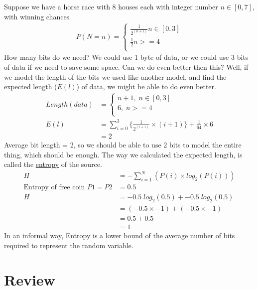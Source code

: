 \documentclass{article}
\begin{document}
    Suppose we have a horse race with 8 houses each with integer number $n \in [0,7]$, with winning chances
    \begin{align}
        P(N = n) = 
        \begin{cases}
            \frac{1}{2^{(n+1)}} n \in [0,3]\\
            \frac{1}{2} n >= 4\\
        \end{cases} 
    \end{align}
    How many bits do we need? We could use 1 byte of data, 
    or we could use 3 bits of data if we need to save some space.
    Can we do even better then this? 
    Well, if we model the length of the bits we used like another model, 
    and find the expected length ($E(l)$) of data, we might be able to do even better.
    \begin{align}
        Length(data) &= 
        \begin{cases}
            n + 1,\;n \in [0,3]\\
            6,\;n >= 4\\
        \end{cases}\\
        E(l) &= \sum_{i = 0}^{3}{\biggr\{\frac{1}{2^(i+1)} \times (i+1)\biggr\}} + \frac{1}{64} \times 6\\
             &= 2
    \end{align}
    Average bit length = 2, so we should be able to use 2 bits to model the entire thing, which should be enough.
    The way we calculated the expected length, is called the \underline{entropy} of the source.
    \begin{align}
        H &= -\sum_{i = 1}^{N}{(P(i)\times log_2(P(i)))}\\
        \text{Entropy of free coin~} P1 = P2 &= 0.5\\
        H &= -0.5\;log_2(0.5) + -0.5\;log_2(0.5)\\
          &= (-0.5 \times -1) + (-0.5 \times -1)\\
          &= 0.5 + 0.5\\
          &= 1
    \end{align}
    In an informal way, Entropy is a lower bound of the average number of bits required to represent the random variable.
    \newpage
\section{Review}
\end{document}
